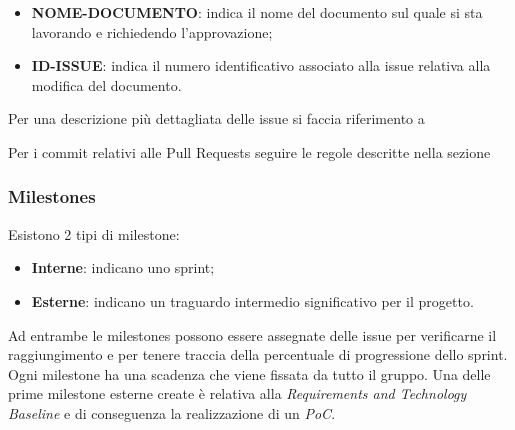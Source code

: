         \begin{itemize}
            \item \textbf{NOME-DOCUMENTO}: indica il nome del documento sul quale si sta lavorando e richiedendo l'approvazione;
            \item \textbf{ID-ISSUE}: indica il numero identificativo associato alla issue relativa alla modifica del documento.
        \end{itemize}

        Per una descrizione più dettagliata delle issue si faccia riferimento a 

        Per i commit relativi alle Pull Requests seguire le regole descritte nella sezione 

        \subsubsection{Milestones}
        Esistono 2 tipi di milestone:
        \begin{itemize}
            \item \textbf{Interne}: indicano uno sprint;
            \item \textbf{Esterne}: indicano un traguardo intermedio significativo per il progetto.
        \end{itemize}
        Ad entrambe le milestones possono essere assegnate delle issue per verificarne il raggiungimento e per tenere traccia
        della percentuale di progressione dello sprint.
        Ogni milestone ha una scadenza che viene fissata da tutto il gruppo. Una delle prime milestone esterne create è
        relativa alla \textit{Requirements and Technology Baseline} e di conseguenza la realizzazione di un \textit{PoC}.


